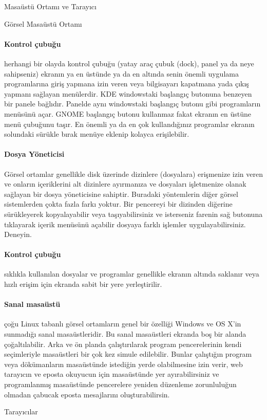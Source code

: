 \begin{section}{Masaüstü Ortamı ve Tarayıcı}
\begin{subsection}{Görsel Masaüstü Ortamı}
\paragraph{Kontrol çubuğu}{ herhangi bir olayda kontrol çubuğu (yatay araç çubuk (dock), panel ya da neye sahipseniz) ekranın ya en üstünde ya da en altında senin önemli uygulama programlarına giriş yapmana izin veren veya bilgisayarı kapatmana yada çıkış yapmanı sağlayan menülerdir. KDE windowstaki başlangıç butonuna benzeyen bir panele bağlıdır. Panelde aynı windowstaki başlangıç butonu gibi programların menüsünü açar. GNOME başlangıç butonu kullanmaz fakat ekranın en üstüne menü çubuğunu taşır. En önemli ya da en çok kullandığınız programlar ekranın solundaki sürükle bırak menüye eklenip kolayca erişilebilir.}
\paragraph{Dosya Yöneticisi}{ Görsel ortamlar genellikle disk üzerinde dizinlere (dosyalara) erişmenize izin veren ve onların içeriklerini alt dizinlere ayırmanıza ve dosyaları işletmenize olanak sağlayan bir dosya yöneticisine sahiptir. Buradaki yöntemlerin diğer görsel sistemlerden çokta fazla farkı yoktur. Bir pencereyi bir dizinden diğerine sürükleyerek kopyalayabilir veya taşıyabilirsiniz ve isterseniz farenin sağ butonuna tıklayarak içerik menüsünü açabilir dosyaya farklı işlemler uygulayabilirsiniz. Deneyin.}
\paragraph{Kontrol çubuğu}{ sıklıkla kullanılan dosyalar ve programlar genellikle ekranın altında saklanır veya hızlı erişim için ekranda sabit bir yere yerleştirilir. }
\paragraph{Sanal masaüstü}{ çoğu Linux tabanlı görsel ortamların genel bir özelliği Windows ve OS X’in sunmadığı sanal masaüstleridir. Bu sanal masaüstleri ekranda boş bir alanda çoğaltılabilir. Arka ve ön planda çalıştırılarak program pencerelerinin kendi seçimleriyle masaüstleri bir çok kez simule edilebilir. Bunlar çalıştığın program veya dökümanların masaüstünde istediğin yerde olabilmesine izin verir, web tarayıcın ve eposta okuyucun için masaüstünde yer ayırabilirsiniz ve programlanmış masaüstünde pencerelere yeniden düzenleme zorunluluğun olmadan çabucak eposta mesajlarını  oluşturabilirsin.}
\end{subsection}
\begin{subsection}{Tarayıcılar}


\end{subsection}
\end{section}
